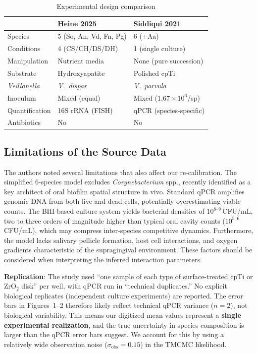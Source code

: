 \documentclass[11pt,a4paper]{article}
\begin{document}
\begin{table}[H]\centering\small
\caption{Experimental design comparison}
\label{tab:design_comparison}
\begin{tabular}{lll}
\toprule
 & Heine 2025 & Siddiqui 2021 \\
\midrule
Species & 5 (So, An, Vd, Fn, Pg) & 6 (+Aa) \\
Conditions & 4 (CS/CH/DS/DH) & 1 (single culture) \\
Manipulation & Nutrient media & None (pure succession) \\
Substrate & Hydroxyapatite & Polished cpTi \\
\textit{Veillonella} & \textit{V.\ dispar} & \textit{V.\ parvula} \\
Inoculum & Mixed (equal) & Mixed ($1.67 \times 10^6$/sp) \\
Quantification & 16S rRNA (FISH) & qPCR (species-specific) \\
Antibiotics & No & No \\
\bottomrule
\end{tabular}
\end{table}

\subsection{Limitations of the Source Data}

The authors noted several limitations that also affect our re-calibration.
The simplified 6-species model excludes \textit{Corynebacterium} spp., recently
identified as a key architect of oral biofilm spatial structure in vivo.
Standard qPCR amplifies genomic DNA from both live and dead cells, potentially
overestimating viable counts. The BHI-based culture system yields bacterial
densities of $10^{8\text{--}9}$\,CFU/mL, two to three orders of magnitude
higher than typical oral cavity counts ($10^{5\text{--}6}$\,CFU/mL), which
may compress inter-species competitive dynamics. Furthermore, the model lacks
salivary pellicle formation, host cell interactions, and oxygen gradients
characteristic of the supragingival environment. These factors should be
considered when interpreting the inferred interaction parameters.

\textbf{Replication}: The study used ``one sample of each type of surface-treated
cpTi or ZrO$_2$ disk'' per well, with qPCR run in ``technical duplicates.''
No explicit biological replicates (independent culture experiments) are reported.
The error bars in Figures~1--2 therefore likely reflect technical qPCR variance
($n=2$), not biological variability. This means our digitized mean values
represent a \textbf{single experimental realization}, and the true uncertainty
in species composition is larger than the qPCR error bars suggest.
We account for this by using a relatively wide observation noise
($\sigma_\text{obs} = 0.15$) in the TMCMC likelihood.
\end{document}
